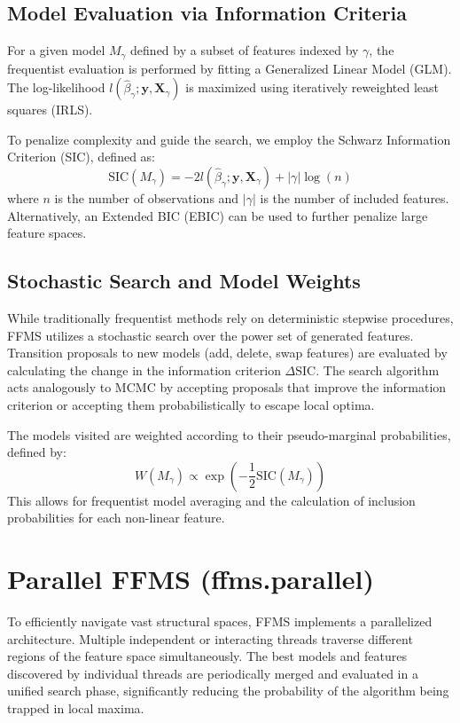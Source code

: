 \documentclass[12pt,a4paper]{article}
\begin{document}
\subsection{Model Evaluation via Information Criteria}
For a given model $M_\gamma$ defined by a subset of features indexed by $\gamma$, the frequentist evaluation is performed by fitting a Generalized Linear Model (GLM). The log-likelihood $l(\hat{\beta}_\gamma; \mathbf{y}, \mathbf{X}_\gamma)$ is maximized using iteratively reweighted least squares (IRLS).

To penalize complexity and guide the search, we employ the Schwarz Information Criterion (SIC), defined as:
\begin{equation}
    \text{SIC}(M_\gamma) = -2 l(\hat{\beta}_\gamma; \mathbf{y}, \mathbf{X}_\gamma) + |\gamma| \log(n)
\end{equation}
where $n$ is the number of observations and $|\gamma|$ is the number of included features. Alternatively, an Extended BIC (EBIC) can be used to further penalize large feature spaces.

\subsection{Stochastic Search and Model Weights}
While traditionally frequentist methods rely on deterministic stepwise procedures, FFMS utilizes a stochastic search over the power set of generated features. Transition proposals to new models (add, delete, swap features) are evaluated by calculating the change in the information criterion $\Delta \text{SIC}$. The search algorithm acts analogously to MCMC by accepting proposals that improve the information criterion or accepting them probabilistically to escape local optima. 

The models visited are weighted according to their pseudo-marginal probabilities, defined by:
\begin{equation}
    W(M_\gamma) \propto \exp\left( - \frac{1}{2} \text{SIC}(M_\gamma) \right)
\end{equation}
This allows for frequentist model averaging and the calculation of inclusion probabilities for each non-linear feature.

\section{Parallel FFMS (ffms.parallel)}
To efficiently navigate vast structural spaces, FFMS implements a parallelized architecture. Multiple independent or interacting threads traverse different regions of the feature space simultaneously. The best models and features discovered by individual threads are periodically merged and evaluated in a unified search phase, significantly reducing the probability of the algorithm being trapped in local maxima. 
\end{document}
